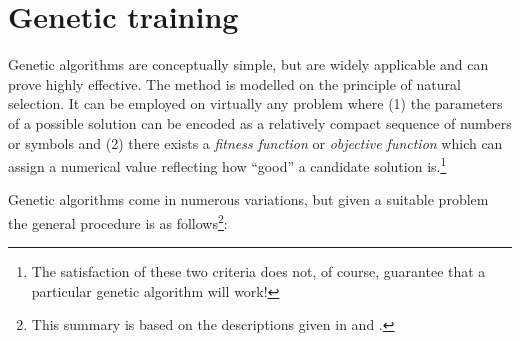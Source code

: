 \section{Genetic training}
\label{theory-ga}

Genetic algorithms are conceptually simple, but are widely applicable
and can prove highly effective. The method is modelled on the
principle of natural selection. It can be employed on virtually any
problem where (1) the parameters of a possible solution can be encoded
as a relatively compact sequence of numbers or symbols and (2) there
exists a \emph{fitness function} or \emph{objective function} which
can assign a numerical value reflecting how ``good'' a candidate
solution is.\footnote{The satisfaction of these two criteria does not,
  of course, guarantee that a particular genetic algorithm will work!}

Genetic algorithms come in numerous variations, but given a suitable
problem the general procedure is as follows\footnote{This summary is
  based on the descriptions given in \cite{wasserman93} and 
  \cite{winston92}.}:

